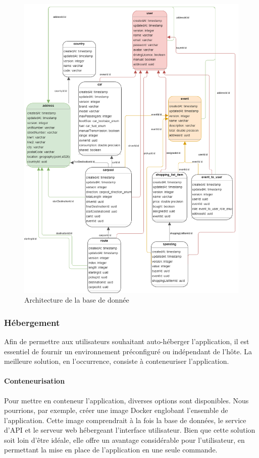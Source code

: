 \begin{figure}[h!]
    \includegraphics[width=\linewidth]{./images/dbShema}\caption{Architecture de la base de donnée}\label{fig:dbSchema}
    \centering
\end{figure}
\newpage

\subsubsection{Hébergement}\label{subsubsec:hebergement}
Afin de permettre aux utilisateurs souhaitant auto-héberger l'application, il est essentiel de fournir un environnement préconfiguré ou indépendant de l'hôte.
La meilleure solution, en l'occurrence, consiste à conteneuriser l'application.

\paragraph{Conteneurisation}
Pour mettre en conteneur l'application, diverses options sont disponibles.
Nous pourrions, par exemple, créer une image Docker englobant l'ensemble de l'application.
Cette image comprendrait à la fois la base de données, le service d'API et le serveur web hébergeant l'interface utilisateur.
Bien que cette solution soit loin d'être idéale, elle offre un avantage considérable pour l'utilisateur, en permettant la mise en place de l'application en une seule commande.

